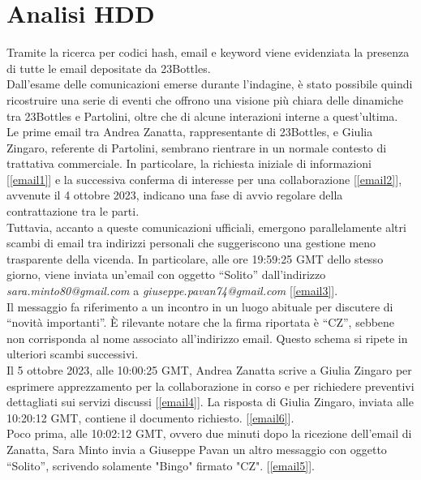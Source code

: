 \section{Analisi HDD}
Tramite la ricerca per codici hash, email e keyword viene evidenziata la presenza di tutte le email depositate da 23Bottles.\vspace{14pt}\\
Dall’esame delle comunicazioni emerse durante l’indagine, è stato possibile quindi ricostruire una serie di eventi che offrono una visione più chiara delle dinamiche tra 23Bottles e Partolini, oltre che di alcune interazioni interne a quest’ultima.\vspace{14pt}\\
Le prime email tra Andrea Zanatta, rappresentante di 23Bottles, e Giulia Zingaro, referente di Partolini, sembrano rientrare in un normale contesto di trattativa commerciale. In particolare, la richiesta iniziale di informazioni [\ref{email1}] e la successiva conferma di interesse per una collaborazione [\ref{email2}], avvenute il 4 ottobre 2023, indicano una fase di avvio regolare della contrattazione tra le parti.\\
Tuttavia, accanto a queste comunicazioni ufficiali, emergono parallelamente altri scambi di email tra indirizzi personali che suggeriscono una gestione meno trasparente della vicenda.
In particolare, alle ore 19:59:25 GMT dello stesso giorno, viene inviata un’email con oggetto “Solito” dall’indirizzo \textit{sara.minto80@gmail.com} a \textit{giuseppe.pavan74@gmail.com} [\ref{email3}].\\
Il messaggio fa riferimento a un incontro in un luogo abituale per discutere di “novità importanti”. È rilevante notare che la firma riportata è “CZ”, sebbene non corrisponda al nome associato all’indirizzo email. Questo schema si ripete in ulteriori scambi successivi.\vspace{14pt}\\
Il 5 ottobre 2023, alle 10:00:25 GMT, Andrea Zanatta scrive a Giulia Zingaro per esprimere apprezzamento per la collaborazione in corso e per richiedere preventivi dettagliati sui servizi discussi [\ref{email4}]. La risposta di Giulia Zingaro, inviata alle 10:20:12 GMT, contiene il documento richiesto. [\ref{email6}].\\
Poco prima, alle 10:02:12 GMT, ovvero due minuti dopo la ricezione dell’email di Zanatta, Sara Minto invia a Giuseppe Pavan un altro messaggio con oggetto “Solito”, scrivendo solamente "Bingo" firmato "CZ". [\ref{email5}].\vspace{14pt}\\

